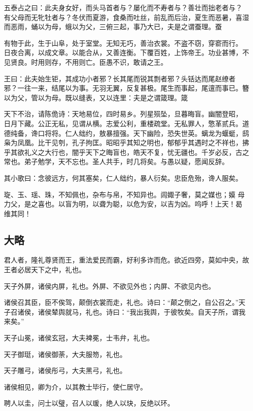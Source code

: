 \documentclass[]{article}
\begin{document}
五泰占之曰：此夫身女好，而头马首者与？屡化而不寿者与？善壮而拙老者与？
有父母而无牝牡者与？冬伏而夏游，食桑而吐丝，前乱而后治，夏生而恶暑，喜湿
而恶雨，蛹以为母，蛾以为父，三俯三起，事乃大已，夫是之谓蚕理。蚕

有物于此，生于山阜，处于室堂。无知无巧，善治衣裳。不盗不窃，穿窬而行。
日夜合离，以成文章。以能合从，又善连衡。下覆百姓，上饰帝王。功业甚博，不
见贤良。时用则存，不用则亡。臣愚不识，敢请之王。

王曰：此夫始生钜，其成功小者邪？长其尾而锐其剽者邪？头铦达而尾赵缭者
邪？一往一来，结尾以为事。无羽无翼，反复甚极。尾生而事起，尾邅而事已。簪
以为父，管以为母。既以缝表，又以连里：夫是之谓箴理。箴

天下不治，请陈佹诗：天地易位，四时易乡。列星殒坠，旦暮晦盲。幽闇登昭，
日月下藏。公正无私，见谓从横。志爱公利，重楼疏堂。无私罪人，憼革贰兵。道
德纯备，谗口将将。仁人绌约，敖暴擅强。天下幽险，恐失世英。螭龙为蝘蜓，鸱
枭为凤凰。比干见刳，孔子拘匡。昭昭乎其知之明也，郁郁乎其遇时之不祥也，拂
乎其欲礼义之大行也，闇乎天下之晦盲也，皓天不复，忧无疆也。千岁必反，古之
常也。弟子勉学，天不忘也。圣人共手，时几将矣。与愚以疑，愿闻反辞。

其小歌曰：念彼远方，何其塞矣，仁人绌约，暴人衍矣。忠臣危殆，谗人服矣。

琁、玉、瑶、珠，不知佩也，杂布与帛，不知异也。闾娵子奢，莫之媒也；嫫
母力父，是之喜也。以盲为明，以聋为聪，以危为安，以吉为凶。呜呼！上天！曷
维其同！

\hypertarget{header-n116}{%
\subsection{大略}\label{header-n116}}

君人者，隆礼尊贤而王，重法爱民而霸，好利多诈而危。欲近四旁，莫如中央，故王者必居天下之中，礼也。

天子外屏，诸侯内屏，礼也。外屏、不欲见外也；内屏、不欲见内也。

诸侯召其臣，臣不俟驾，颠倒衣裳而走，礼也。诗曰：``颠之倒之，自公召之。''天子召诸侯，诸侯辇舆就马，礼也。诗曰：``我出我舆，于彼牧矣。自天子所，谓我来矣。''

天子山冕，诸侯玄冠，大夫裨冕，士韦弁，礼也。

天子御珽，诸侯御荼，大夫服笏，礼也。

天子雕弓，诸侯彤弓，大夫黑弓，礼也。

诸侯相见，卿为介，以其教士毕行，使仁居守。

聘人以圭，问士以璧，召人以瑗，绝人以玦，反绝以环。
\end{document}
